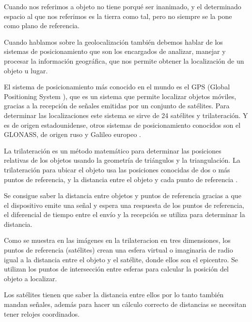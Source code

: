 Cuando nos referimos a objeto no tiene porqué ser inanimado, y el determinado espacio al que nos referimos es la tierra como tal, pero no siempre se la pone como plano de referencia. 

Cuando hablamos sobre la geolocalización también debemos hablar de los sistemas de posicionamiento que son los encargados de analizar, manejar y procesar la información geográfica, que nos permite obtener la localización de un objeto u lugar.

El sistema de posicionamiento más conocido en el mundo es el GPS (Global Positioning System ), que es un sistema que permite localizar objetos móviles, gracias a la recepción de señales emitidas por un conjunto de satélites. Para determinar las localizaciones este sistema se sirve de 24 satélites y trilateración. Y es de origen estadounidense, otros sistemas de posicionamiento conocidos son el GLONASS, de origen ruso y Galileo europeo \cite{noauthor_sistema_2017:a}.

La trilateración es un método matemático para determinar las posiciones relativas de los objetos usando la geometría de triángulos y la triangulación. La trilateración para ubicar el objeto usa las posiciones conocidas de dos o más puntos de referencia, y la distancia entre el objeto y cada punto de referencia \cite{noauthor_trilateracion_2015:a}.


Se consigue saber la distancia entre objetos y puntos de referencia gracias a que el dispositivo emite una señal y espera una respuesta de los puntos de referencia, el diferencial de tiempo entre el envío y la recepción se utiliza para determinar la distancia.

Como se muestra en las imágenes en la trilateracion en tres dimensiones, los puntos de referencia (satélites) crean una esfera virtual o imaginaria de radio igual a la distancia entre el objeto y el satélite, donde ellos son el epicentro. Se utilizan los puntos de intersección entre esferas para calcular la posición del objeto a localizar.

Los satélites tienen que saber la distancia entre ellos por lo tanto también mandan señales, además para hacer un cálculo correcto de distancias se necesitan tener relojes coordinados.
\\





